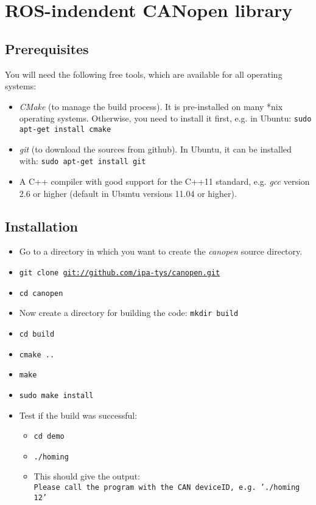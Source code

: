  \section{ROS-indendent CANopen library}

\subsection{Prerequisites}

You will need the following free tools, which are available for all operating systems:
\begin{itemize}
\item {\em CMake} (to manage the build process). It is pre-installed on many *nix operating systems. Otherwise, you need to install it first, e.g. in Ubuntu:
\texttt{sudo apt-get install cmake}
\item {\em git} (to download the sources from github). In Ubuntu, it can be installed with: \texttt{sudo apt-get install git}
\item A C++ compiler with good support for the C++11 standard, e.g. {\em gcc} version 2.6 or higher (default in Ubuntu versions 11.04 or higher).
\end{itemize}

\subsection{Installation}

\begin{itemize}
\item Go to a directory in which you want to create the {\em canopen} source directory.
\item \texttt{git clone \url{git://github.com/ipa-tys/canopen.git}}
\item \texttt{cd canopen}
\item Now create a directory for building the code: \texttt{mkdir build}
\item \texttt{cd build}
\item \texttt{cmake ..}
\item \texttt{make}
\item \texttt{sudo make install}
\item Test if the build was successful:
\begin{itemize} 
\item \texttt{cd demo}
\item \texttt{./homing}
\item This should give the output:\\
\texttt{Please call the program with the CAN deviceID, e.g. './homing 12'}
\end{itemize}
\end{itemize}

